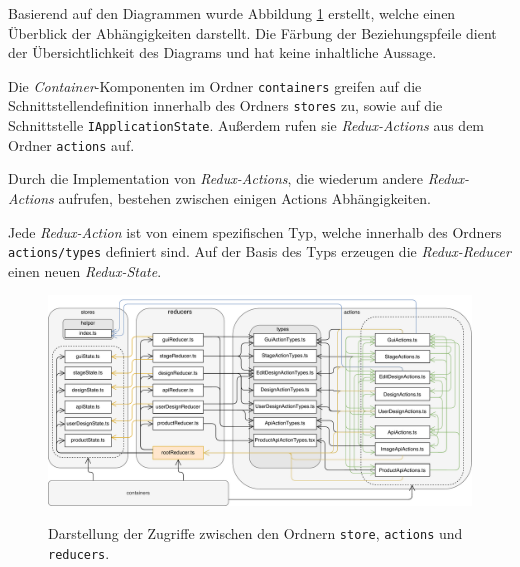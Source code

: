 Basierend auf den Diagrammen wurde Abbildung \ref{fig:Redux} erstellt, welche einen Überblick der Abhängigkeiten darstellt. Die Färbung der Beziehungspfeile dient der Übersichtlichkeit des Diagrams und hat keine inhaltliche Aussage.

Die \emph{Container}-Komponenten im Ordner \lstinline|containers| greifen auf die Schnittstellendefinition innerhalb des Ordners \lstinline|stores| zu, sowie auf die Schnittstelle \lstinline|IApplicationState|. 
Außerdem rufen sie \emph{Redux-Actions} aus dem Ordner \lstinline|actions| auf.

Durch die Implementation von \emph{Redux-Actions}, die wiederum andere \emph{Redux-Actions} aufrufen, bestehen zwischen einigen  Actions Abhängigkeiten.  

Jede \emph{Redux-Action} ist von einem spezifischen Typ, welche innerhalb des Ordners \lstinline|actions/types| definiert sind. Auf der Basis des Typs erzeugen die \emph{Redux-Reducer} einen neuen \emph{Redux-State}.

\begin{figure}[H]
    \centering
    \caption{Darstellung der Zugriffe zwischen den Ordnern \lstinline|store|, \lstinline|actions| und \lstinline|reducers|.}
    \includegraphics[width=1\textwidth]{diagrams/Ist-Architektur/Redux.pdf}
    \label{fig:Redux}
\end{figure}



